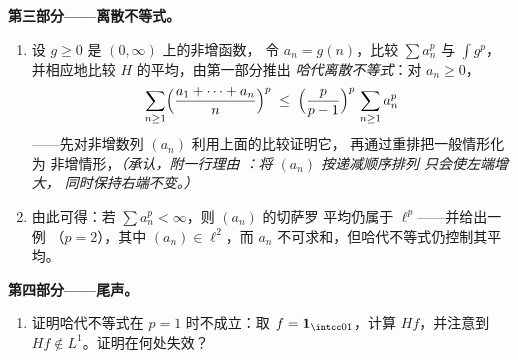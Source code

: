 \begin{problem}
\medskip
\noindent\textbf{第三部分——离散不等式。}
\begin{enumerate}[resume]
  \item 设 $g \geq 0$ 是 $(0,\infty)$ 上的非增函数，
        令 $a_n = g(n)$，比较 $\sum a_n^p$ 与 $\int g^p$，
        并相应地比较 $H$ 的平均，由第一部分推出
        \emph{哈代离散不等式}：对 $a_n \geq 0$，
        \[
        \sum_{n\geq1}\Bigl(\frac{a_1 + \dots +
        a_n}{n}\Bigr)^{p}
        \;\leq\;
        \Bigl(\frac{p}{p-1}\Bigr)^{p}\,\sum_{n\geq1}a_n^p
        \]
——先对非增数列 $(a_n)$ 利用上面的比较证明它，
        再通过重排把一般情形化为
        非增情形，\emph{（承认，附一行理由
        ：将 $(a_n)$ 按递减顺序排列
        只会使左端增大，
        同时保持右端不变。）}
  \item 由此可得：若 $\sum a_n^p < \infty$，则 $(a_n)$ 的切萨罗
        平均仍属于 $\ell^p$——并给出一例
        （$p = 2$），其中 $(a_n) \in \ell^2$，而 $a_n$
        不可求和，但哈代不等式仍控制其平均。
\end{enumerate}

\medskip
\noindent\textbf{第四部分——尾声。}
\begin{enumerate}[resume]
  \item 证明哈代不等式在 $p = 1$ 时不成立：取
        $f = \mathbf 1_{\intcc01}$，计算 $Hf$，并注意到
        $Hf \notin L^1$。证明在何处失效？
\end{enumerate}


\end{problem}
